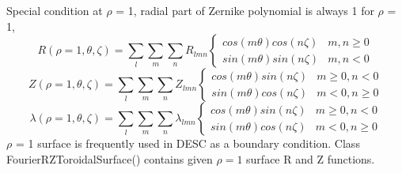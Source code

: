 Special condition at $\rho$ = 1, radial part of Zernike polynomial is always 1 for $\rho$ = 1,
\begin{equation}
    R(\rho=1,\theta,\zeta) = \sum_{l}^{}\sum_{m}^{}\sum_{n}^{} R_{lmn} \begin{cases}
        cos(m\theta)cos(n\zeta)  & m,n \geq 0  \\
        sin(m\theta)sin(n\zeta)  & m,n < 0
    \end{cases}
\end{equation}
\begin{equation}
    Z(\rho=1,\theta,\zeta) = \sum_{l}^{}\sum_{m}^{}\sum_{n}^{} Z_{lmn} \begin{cases}
        cos(m\theta)sin(n\zeta)  & m \geq 0, n < 0 \\
        sin(m\theta)cos(n\zeta)  & m< 0, n \geq 0
    \end{cases}
\end{equation}
\begin{equation}
    \lambda(\rho=1,\theta,\zeta) = \sum_{l}^{}\sum_{m}^{}\sum_{n}^{} \lambda_{lmn} \begin{cases}
        cos(m\theta)sin(n\zeta)  & m \geq 0, n < 0 \\
        sin(m\theta)cos(n\zeta)  & m< 0, n \geq 0
    \end{cases}
\end{equation}
$\rho$ = 1 surface is frequently used in DESC as a boundary condition. Class {\color{ForestGreen}FourierRZToroidalSurface()} contains given $\rho=1$ surface R and Z functions.

